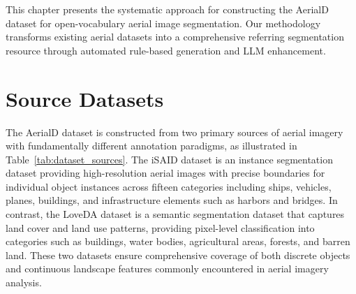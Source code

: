 \cleardoublepage
\label{chap:implement}

This chapter presents the systematic approach for constructing the AerialD dataset for open-vocabulary aerial image segmentation. Our methodology transforms existing aerial datasets into a comprehensive referring segmentation resource through automated rule-based generation and LLM enhancement.

\section{Source Datasets}

\noindent The AerialD dataset is constructed from two primary sources of aerial imagery with fundamentally different annotation paradigms, as illustrated in Table~\ref{tab:dataset_sources}. The iSAID dataset is an instance segmentation dataset providing high-resolution aerial images with precise boundaries for individual object instances across fifteen categories including ships, vehicles, planes, buildings, and infrastructure elements such as harbors and bridges. In contrast, the LoveDA dataset is a semantic segmentation dataset that captures land cover and land use patterns, providing pixel-level classification into categories such as buildings, water bodies, agricultural areas, forests, and barren land. These two datasets ensure comprehensive coverage of both discrete objects and continuous landscape features commonly encountered in aerial imagery analysis.



